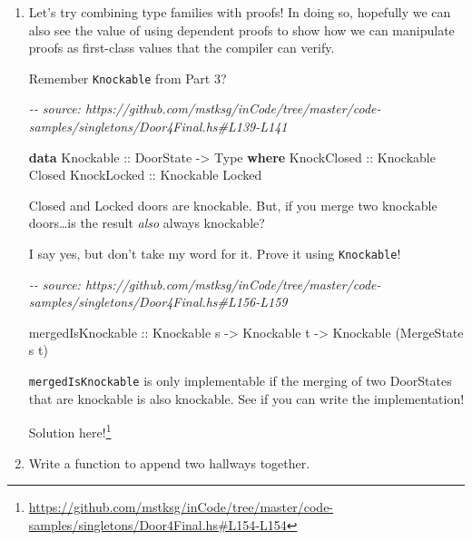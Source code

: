 \documentclass[]{article}
\newenvironment{Shaded}{}{}
\newcommand{\CommentTok}[1]{\textcolor[rgb]{0.38,0.63,0.69}{\textit{#1}}}
\newcommand{\DataTypeTok}[1]{\textcolor[rgb]{0.56,0.13,0.00}{#1}}
\newcommand{\KeywordTok}[1]{\textcolor[rgb]{0.00,0.44,0.13}{\textbf{#1}}}
\newcommand{\NormalTok}[1]{#1}
\newcommand{\OtherTok}[1]{\textcolor[rgb]{0.00,0.44,0.13}{#1}}
\renewcommand{\href}[2]{#2\footnote{\url{#1}}}
\begin{document}
\begin{enumerate}
\def\labelenumi{\arabic{enumi}.}
\item
  Let's try combining type families with proofs! In doing so, hopefully we can
  also see the value of using dependent proofs to show how we can manipulate
  proofs as first-class values that the compiler can verify.

  Remember \texttt{Knockable} from Part 3?

\begin{Shaded}
\begin{Highlighting}[]
\CommentTok{{-}{-} source: https://github.com/mstksg/inCode/tree/master/code{-}samples/singletons/Door4Final.hs\#L139{-}L141}

\KeywordTok{data} \DataTypeTok{Knockable}\OtherTok{ ::} \DataTypeTok{DoorState} \OtherTok{{-}\textgreater{}} \DataTypeTok{Type} \KeywordTok{where}
    \DataTypeTok{KnockClosed}\OtherTok{ ::} \DataTypeTok{Knockable} \DataTypeTok{\textquotesingle{}Closed}
    \DataTypeTok{KnockLocked}\OtherTok{ ::} \DataTypeTok{Knockable} \DataTypeTok{\textquotesingle{}Locked}
\end{Highlighting}
\end{Shaded}

  Closed and Locked doors are knockable. But, if you merge two knockable
  doors\ldots is the result \emph{also} always knockable?

  I say yes, but don't take my word for it. Prove it using \texttt{Knockable}!

\begin{Shaded}
\begin{Highlighting}[]
\CommentTok{{-}{-} source: https://github.com/mstksg/inCode/tree/master/code{-}samples/singletons/Door4Final.hs\#L156{-}L159}

\NormalTok{mergedIsKnockable}
\OtherTok{    ::} \DataTypeTok{Knockable}\NormalTok{ s}
    \OtherTok{{-}\textgreater{}} \DataTypeTok{Knockable}\NormalTok{ t}
    \OtherTok{{-}\textgreater{}} \DataTypeTok{Knockable}\NormalTok{ (}\DataTypeTok{MergeState}\NormalTok{ s t)}
\end{Highlighting}
\end{Shaded}

  \texttt{mergedIsKnockable} is only implementable if the merging of two
  DoorStates that are knockable is also knockable. See if you can write the
  implementation!

  \href{https://github.com/mstksg/inCode/tree/master/code-samples/singletons/Door4Final.hs\#L154-L154}{Solution
  here!}
\item
  Write a function to append two hallways together.


\end{enumerate}
\end{document}
